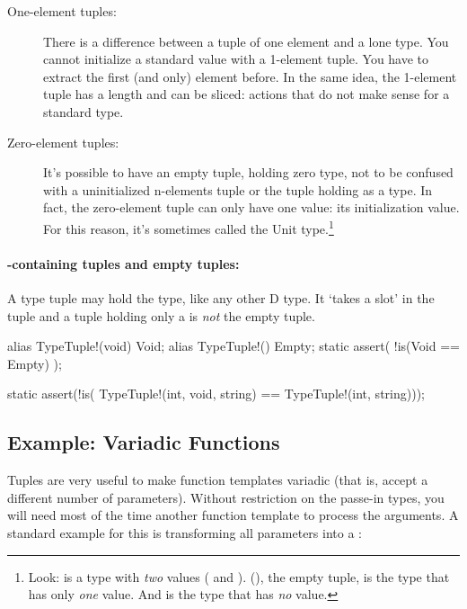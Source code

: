 \begin{description}
\item[One-element tuples:] There is a difference between a tuple of one element and a lone type. You cannot initialize a standard value with a 1-element tuple. You have to extract the first (and only) element before. In the same idea, the 1-element tuple has a length and can be sliced: actions that do not make sense for a standard type.
\item[Zero-element tuples:] It's possible to have an empty tuple, holding zero type, not to be confused with a uninitialized n-elements tuple or the tuple holding  as a type. In fact, the zero-element tuple can only have one value: its initialization value. For this reason, it's sometimes called the Unit type.\footnote{ Look:  is a type with \emph{two} values ( and ). (), the empty tuple, is the type that has only \emph{one} value. And  is the type that has \emph{no} value.}
\end{description}

\paragraph{-containing tuples and empty tuples: } A type tuple may hold the  type, like any other D type. It `takes a slot' in the tuple and a tuple holding only a  is \emph{not} the empty tuple.

\begin{dcode}
alias TypeTuple!(void) Void;
alias TypeTuple!() Empty;
static assert( !is(Void == Empty) );

static assert(!is( TypeTuple!(int, void, string) == TypeTuple!(int, string)));
\end{dcode}

\subsection{Example: Variadic Functions}\label{variadicfunctions}

Tuples are very useful to make function templates variadic (that is, accept a different number of parameters). Without restriction on the passe-in types, you will need most of the time another function template to process the arguments. A standard example for this is transforming all parameters into a :

